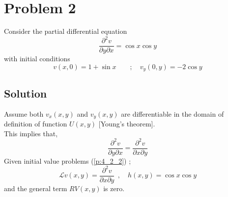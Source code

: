 \documentclass[11pt]{report}
\newcommand{\Laplace}{\mathcal{L}}
\newcommand{\sps}{\\[0.2cm]}
\begin{document}
	\section*{Problem 2}
	Consider the partial differential equation
	\begin{equation}
		\frac{\partial^2 v}{\partial y\partial x} = \cos x \cos y\label{p:4_2_1} \tag{1}
	\end{equation}
	with initial conditions
	\begin{equation}
		v(x,0)=1+\sin x \qquad ; \quad v_y(0,y)=-2\cos y  \label{p:4_2_2} \tag{2}
	\end{equation}
	
	\subsection*{Solution}
	Assume both $v_x(x,y)$ and $v_y(x,y)$ are differentiable in the domain of definition of function $U(x,y)$ [Young's theorem].\sps
	This implies that,
	\begin{equation*}
		\frac{\partial^2 v}{\partial y \partial x}= \frac{\partial^2 v}{\partial x \partial y}
	\end{equation*}
	Given initial value problems (\ref{p:4_2_2}) ;
	\begin{equation*}
		\Laplace v(x,y) = \frac{\partial^2 v}{\partial x\partial y}~~ , \quad h(x,y) =\cos x \cos y
	\end{equation*}
	and the general term $RV(x,y)$ is zero.\\
	
\end{document}
